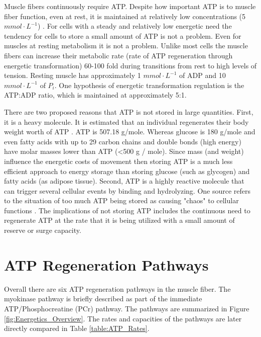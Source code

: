 Muscle fibers continuously require ATP. Despite how important ATP is to muscle fiber function, even at rest, it is maintained at relatively low concentrations (5 $mmol \cdot L^{-1}$) \cite{feher_quantitative_2017, jones_skeletal_2006}. For cells with a steady and relatively low energetic need the tendency for cells to store a small amount of ATP is not a problem. Even for muscles at resting metabolism it is not a problem. Unlike most cells the muscle fibers can increase their metabolic rate (rate of ATP regeneration through energetic transformation) 60-100 fold during transitions from rest to high levels of tension. Resting muscle has approximately 1 $mmol \cdot L^{-1}$ of ADP and 10 $mmol \cdot L^{-1}$ of $P_i$. One hypothesis of energetic transformation regulation is the ATP:ADP ratio, which is maintained at approximately 5:1.

There are two proposed reasons that ATP is not stored in large quantities. First, it is a heavy molecule. It is estimated that an individual regenerates their body weight worth of ATP \cite{tornroth-horsefield_opening_2008}. ATP is 507.18 g/mole. Whereas glucose is 180 g/mole and even fatty acids with up to 29 carbon chains and double bonds (high energy) have molar masses lower than ATP (<500 g / mole). Since mass (and weight) influence the energetic costs of movement then storing ATP is a much less efficient approach to energy storage than storing glucose (such as glycogen) and fatty acids (as adipose tissue). Second, ATP is a highly reactive molecule that can trigger several cellular events by binding and hydrolyzing. One source refers to the situation of too much ATP being stored as causing "chaos" to cellular functions \cite{jones_skeletal_2006}. The implications of not storing ATP includes the continuous need to regenerate ATP at the rate that it is being utilized with a small amount of reserve or surge capacity.



\section{ATP Regeneration Pathways}

Overall there are six ATP regeneration pathways in the muscle fiber. The myokinase pathway is briefly described as part of the immediate ATP/Phosphocreatine (PCr) pathway. The pathways are summarized in Figure \ref{fig:Energetics_Overview}. The rates and capacities of the pathways are later directly compared in Table \ref{table:ATP_Rates}. 


